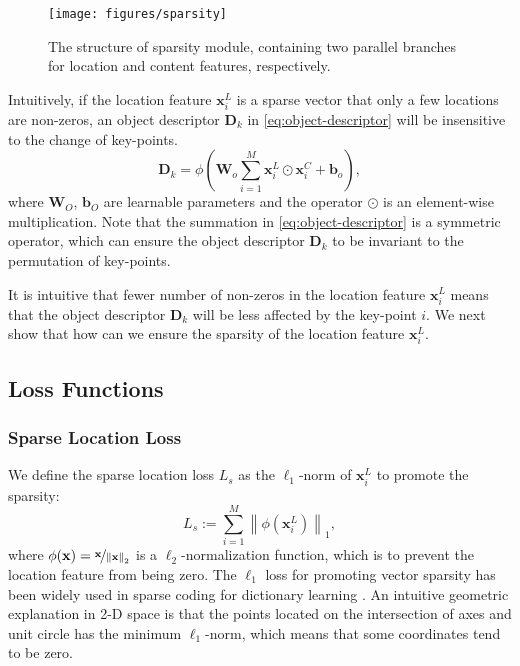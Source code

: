 \documentclass[letterpaper, 10 pt, journal, twoside]{IEEEtran}  %
\newcommand{\fix}[1]{#1}
\begin{document}
\begin{figure}[t]
    \centering
    \texttt{[image: figures/sparsity]}
    \caption{\fix{The structure of sparsity module, containing two parallel branches for location and content features, respectively.}}
    \label{fig:sparsity-module}
\end{figure}


Intuitively, if the location feature $\mathbf{x}_i^L$ is a sparse vector that only a few locations are non-zeros, an object descriptor $\mathbf{D}_k$ in \eqref{eq:object-descriptor} will be insensitive to the change of key-points.
\begin{equation}\label{eq:object-descriptor}
    \mathbf{D}_k  = \phi({\mathbf{W}_o}\sum_{i=1}^{M} \mathbf{x}_i^L \odot \mathbf{x}_i^C + \mathbf{b}_o),
\end{equation}
where $\mathbf{W}_O$, $\mathbf{b}_O$ are learnable parameters and the operator $\odot$ is an element-wise multiplication. Note that the summation in \eqref{eq:object-descriptor} is a symmetric operator, which can ensure the object descriptor $\mathbf{D}_k$ to be invariant to the permutation of key-points.

It is intuitive that fewer number of non-zeros in the location feature $\mathbf{x}_i^L$ means that the object descriptor $\mathbf{D}_k$ will be less affected by the key-point $i$. We next show that how can we ensure the sparsity of the location feature $\mathbf{x}_i^L$.

\subsection{Loss Functions}

\subsubsection{Sparse Location Loss} \label{sec:sparsity-loss}

We define the sparse location loss $L_s$ as the $\ell_1$-norm of $\mathbf{x}_i^L$ to promote the sparsity:
\begin{equation}\label{eq:sparse-loss}
    L_s := \sum_{i=1}^{M} \left\|\phi({\mathbf{x}}_i^L)\right\|_1,
\end{equation}
where $\phi(\mathbf{x}) = \nicefrac{\mathbf{x}}{\left\|\mathbf{x}\right\|_2} $ is a $\ell_2$-normalization function, which is to prevent the location feature from being zero.
The $\ell_1$ loss for promoting vector sparsity has been widely used in sparse coding for dictionary learning \cite{lee2007efficient}.
An intuitive geometric explanation in 2-D space is that the points located on the intersection of axes and unit circle has the minimum $\ell_1$-norm, which means that some coordinates tend to be zero.
\end{document}
